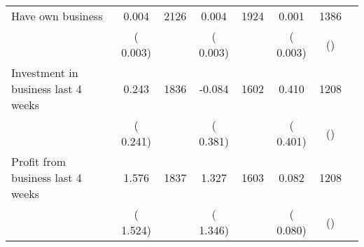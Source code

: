 \begin{tabular}{l*{6}{c}}
Have own business        &              0.004      &       2126       &              0.004      &       1924       &              0.001      &       1386  &  &              \\
                       &       (       0.003)            &                               &       (       0.003)            &                               &       (       0.003)            &       () &                  \\
Investment in business last 4 weeks        &              0.243      &       1836       &             -0.084      &       1602       &              0.410      &       1208  &  &              \\
                       &       (       0.241)            &                               &       (       0.381)            &                               &       (       0.401)            &       () &                  \\
Profit from business last 4 weeks        &              1.576      &       1837       &              1.327      &       1603       &              0.082      &       1208  &  &              \\
                       &       (       1.524)            &                               &       (       1.346)            &                               &       (       0.080)            &       () &                  \\
\hline \end{tabular}